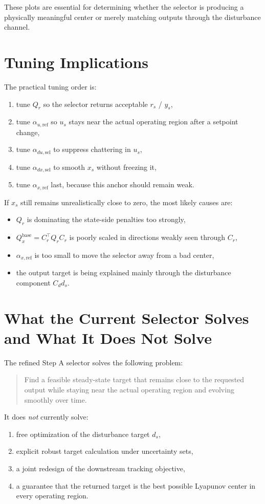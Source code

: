 \documentclass[11pt]{article}
\begin{document}
These plots are essential for determining whether the selector is producing a physically meaningful center or merely matching outputs through the disturbance channel.

\section{Tuning Implications}
The practical tuning order is:
\begin{enumerate}[label=\arabic*.]
\item tune $Q_r$ so the selector returns acceptable $r_s$ / $y_s$,
\item tune $\alpha_{u,\mathrm{ref}}$ so $u_s$ stays near the actual operating region after a setpoint change,
\item tune $\alpha_{du,\mathrm{sel}}$ to suppress chattering in $u_s$,
\item tune $\alpha_{dx,\mathrm{sel}}$ to smooth $x_s$ without freezing it,
\item tune $\alpha_{x,\mathrm{ref}}$ last, because this anchor should remain weak.
\end{enumerate}

If $x_s$ still remains unrealistically close to zero, the most likely causes are:
\begin{itemize}
\item $Q_r$ is dominating the state-side penalties too strongly,
\item $Q_x^{\mathrm{base}} = C_r^\top Q_r C_r$ is poorly scaled in directions weakly seen through $C_r$,
\item $\alpha_{x,\mathrm{ref}}$ is too small to move the selector away from a bad center,
\item the output target is being explained mainly through the disturbance component $C_d d_s$.
\end{itemize}

\section{What the Current Selector Solves and What It Does Not Solve}
The refined Step A selector solves the following problem:
\begin{quote}
Find a feasible steady-state target that remains close to the requested output while staying near the actual operating region and evolving smoothly over time.
\end{quote}

It does \emph{not} currently solve:
\begin{enumerate}[label=\arabic*.]
\item free optimization of the disturbance target $d_s$,
\item explicit robust target calculation under uncertainty sets,
\item a joint redesign of the downstream tracking objective,
\item a guarantee that the returned target is the best possible Lyapunov center in every operating region.
\end{enumerate}
\end{document}
